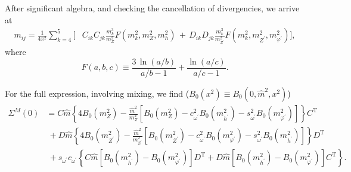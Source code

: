 After significant algebra, and checking the cancellation of divergencies, we arrive at 
%
\begin{align}\label{eq:masses_general2}
 m_{ij} = \frac{1}{4\pi^2}\sum_{k=4}^5 \Big[ & C_{ik} C_{jk} \frac{m_k^3}{m_Z^2}F(m_k^2,m_Z^2,m_h^2)  \,+\, D_{ik} D_{jk} \frac{m_k^3}{m_{Z^\prime}^2}F(m_k^2,m_{Z^\prime}^2,m_{\varphi^\prime}^2) \Big],
\end{align} 
%
where
%
\begin{equation} \label{eq:loop_function_2}
F(a,b,c) \equiv \frac{3 \, \ln{(a/b)}}{a/b - 1}  + \frac{\ln{(a/c)}}{a/c - 1}.
\end{equation}
%

For the full expression, involving mixing, we find ($B_0(x^2) \equiv B_0(0,\hat{m}^2,x^2)$)
%
\begin{align*}
%
    \Sigma^M(0) &= C\hat{m}\left\{ 4B_0(m_Z^2) -
\frac{\hat{m}^2}{m_Z^2}\left[B_0(m_Z^2) - c_{\omega^\prime}^2B_0(m_{h^\prime}^2)- s_{\omega^\prime}^2B_0(m_{\varphi^\prime}^2)\right] \right\}C^\text{T}\\
%
&~+D\hat{m}\left\{ 4B_0(m_{Z^\prime}^2) -
\frac{\hat{m}^2}{m_{Z^\prime}^2}\left[B_0(m_{Z^\prime}^2) - c_{\omega^\prime}^2B_0(m_{\varphi^\prime}^2)- s_{\omega^\prime}^2B_0(m_{h^\prime}^2)\right] \right\}D^\text{T}\\
%
&~+s_{\omega^\prime} c_{\omega^\prime} \left\{C\hat{m}\left[B_0(m_{h^\prime}^2) -B_0(m_{\varphi^\prime}^2) \right]D^\text{T}+D\hat{m}\left[ B_0(m_{h^\prime}^2) -B_0(m_{\varphi^\prime}^2) \right]C^\text{T}\right\}.
%
\end{align*}
